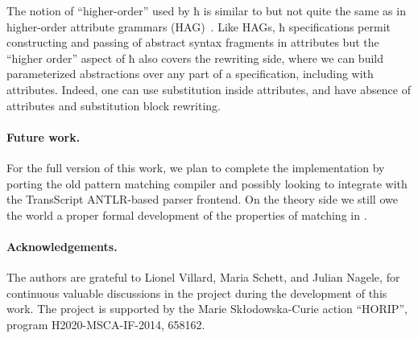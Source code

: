 \documentclass[letterpaper,10pt]{proc}
\begin{document}
The notion of ``higher-order'' used by ħ is similar to but not quite the same as in higher-order
attribute grammars (HAG)~\cite{VogtSwierstraKuiper:pldi1989}. Like HAGs, ħ specifications permit
constructing and passing of abstract syntax fragments in attributes but the ``higher order'' aspect
of ħ also covers the rewriting side, where we can build parameterized abstractions over any part
of a specification, including with attributes. Indeed, one can use substitution inside attributes,
and have absence of attributes and substitution block rewriting.

\paragraph*{Future work.}

For the full version of this work, we plan to complete the implementation by porting the old \CRSX
pattern matching compiler and possibly looking to integrate with the TransScript ANTLR-based parser
frontend. On the theory side we still owe the world a proper formal development of the properties of
matching in \plank.

\paragraph*{Acknowledgements.}

The authors are grateful to Lionel Villard, Maria Schett, and Julian Nagele, for continuous valuable
discussions in the \CRSX project during the development of this work.
The project is supported by the Marie Sk{\l}odowska-Curie action ``HORIP'', program
H2020-MSCA-IF-2014, 658162.



\end{document}
